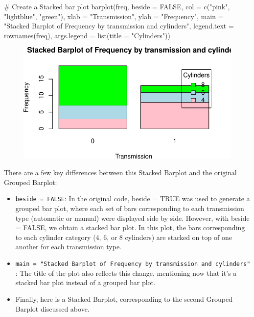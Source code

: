 \documentclass[
  letterpaper,
  DIV=11,
  numbers=noendperiod]{scrreport}
\newenvironment{Shaded}{\begin{snugshade}}{\end{snugshade}}
\newcommand{\AttributeTok}[1]{\textcolor[rgb]{0.40,0.45,0.13}{#1}}
\newcommand{\CommentTok}[1]{\textcolor[rgb]{0.37,0.37,0.37}{#1}}
\newcommand{\ConstantTok}[1]{\textcolor[rgb]{0.56,0.35,0.01}{#1}}
\newcommand{\FunctionTok}[1]{\textcolor[rgb]{0.28,0.35,0.67}{#1}}
\newcommand{\NormalTok}[1]{\textcolor[rgb]{0.00,0.23,0.31}{#1}}
\newcommand{\StringTok}[1]{\textcolor[rgb]{0.13,0.47,0.30}{#1}}
\begin{document}
\begin{Shaded}
\begin{Highlighting}[]
\CommentTok{\# Create a Stacked bar plot}
\FunctionTok{barplot}\NormalTok{(freq, }
        \AttributeTok{beside =} \ConstantTok{FALSE}\NormalTok{, }
        \AttributeTok{col =} \FunctionTok{c}\NormalTok{(}\StringTok{"pink"}\NormalTok{, }\StringTok{"lightblue"}\NormalTok{, }\StringTok{"green"}\NormalTok{), }
        \AttributeTok{xlab =} \StringTok{"Transmission"}\NormalTok{, }\AttributeTok{ylab =} \StringTok{"Frequency"}\NormalTok{, }
        \AttributeTok{main =} \StringTok{"Stacked Barplot of Frequency by transmission and cylinders"}\NormalTok{, }
        \AttributeTok{legend.text =} \FunctionTok{rownames}\NormalTok{(freq), }
        \AttributeTok{args.legend =} \FunctionTok{list}\NormalTok{(}\AttributeTok{title =} \StringTok{"Cylinders"}\NormalTok{))}
\end{Highlighting}
\end{Shaded}

\begin{figure}[H]

{\centering \includegraphics{08CategoricalData02_files/figure-pdf/unnamed-chunk-18-1.pdf}

}

\end{figure}

There are a few key differences between this Stacked Barplot and the
original Grouped Barplot:

\begin{itemize}
\item
  \texttt{beside\ =\ FALSE}: In the original code, beside = TRUE was
  used to generate a grouped bar plot, where each set of bars
  corresponding to each transmission type (automatic or manual) were
  displayed side by side. However, with beside = FALSE, we obtain a
  stacked bar plot. In this plot, the bars corresponding to each
  cylinder category (4, 6, or 8 cylinders) are stacked on top of one
  another for each transmission type.
\item
  \texttt{main\ =\ "Stacked\ Barplot\ of\ Frequency\ by\ transmission\ and\ cylinders"}:
  The title of the plot also reflects this change, mentioning now that
  it's a stacked bar plot instead of a grouped bar plot.
\item
  Finally, here is a Stacked Barplot, corresponding to the second
  Grouped Barplot discussed above.
\end{itemize}
\end{document}
